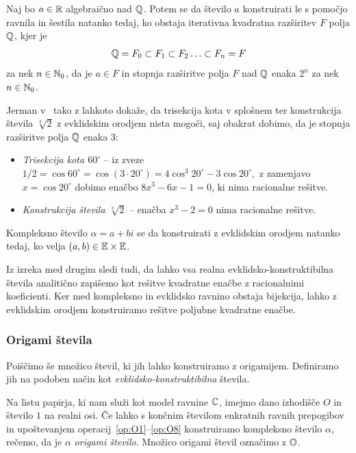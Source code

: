\begin{izrek}
    \label{izr:evkl_konstr}
    Naj bo $a \in \mathbb R$ algebraično nad $\mathbb Q$. Potem se da število $a$ konstruirati le s pomočjo ravnila in šestila natanko tedaj, ko obstaja iterativna kvadratna razširitev $F$ polja $\mathbb Q$, kjer je
    $$ \mathbb Q = F_0 \subset F_1 \subset F_2 \ldots \subset F_n = F$$
    za nek $n \in \mathbb N_0$, da je $a \in F$ in stopnja razširitve polja $F$ nad $\mathbb Q$ enaka $2^n$ za nek $n \in \mathbb N_0$.
\end{izrek}

Jerman v~\cite[str.\ 77--78]{jerman1998} tako z lahkoto dokaže, da trisekcija kota v splošnem ter konstrukcija števila $ \sqrt[3]{2} $ z evklidskim orodjem nista mogoči, saj obakrat dobimo, da je stopnja razširitve polja $\mathbb Q$ enaka $3$:
\begin{itemize}
    \item \emph{Trisekcija kota $60^\circ$} -- iz zveze $ 1/2 = \cos 60^\circ = \cos(3 \cdot 20^\circ) = 4 \cos^3 20^\circ - 3 \cos 20^\circ, $ z zamenjavo $x = \cos 20^\circ$ dobimo enačbo $8 x^3 - 6x - 1 = 0$, ki nima racionalne rešitve.
    \item \emph{Konstrukcija števila $\sqrt[3]{2}$} -- enačba $x^3 - 2 = 0$ nima racionalne rešitve.
\end{itemize}

\begin{posledica}
    Kompleksno število $\alpha = a + bi$ se da konstruirati z evklidskim orodjem natanko tedaj, ko velja $(a, b) \in \mathbb E \times \mathbb E$.
\end{posledica}

Iz izreka med drugim sledi tudi, da lahko vsa realna evklidsko-konstruktibilna števila analitično zapišemo kot rešitve kvadratne enačbe z racionalnimi koeficienti. Ker med kompleksno in evklidsko ravnino obstaja bijekcija, lahko z evklidskim orodjem konstruiramo rešitve poljubne kvadratne enačbe.

\subsubsection{Origami števila}
\label{origami_konstruktibilnost}

Poiščimo še množico števil, ki jih lahko konstruiramo z origamijem. Definiramo jih na podoben način kot \emph{evklidsko-konstruktibilna} števila.

\begin{definicija}
    \label{def:origami_stevilo}
    Na listu papirja, ki nam služi kot model ravnine $\mathbb C$, imejmo dano izhodišče $O$ in število $1$ na realni osi. Če lahko s končnim številom enkratnih ravnih prepogibov in upoštevanjem operacij~\ref{op:O1}--\ref{op:O8} konstruiramo kompleksno število $\alpha$, rečemo, da je $\alpha$ \emph{origami število}. Množico origami števil označimo z $\mathbb O$.
\end{definicija}


